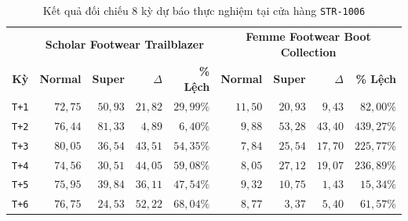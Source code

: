 \begin{table}[H]
	\centering
	\caption{Kết quả đối chiếu $8$ kỳ dự báo thực nghiệm tại cửa hàng \texttt{STR-1006}}
	\label{tab:forecast-empirical}
	\footnotesize
	\begin{tabular}{c | r r r r | r r r r}
		\toprule
		             & \multicolumn{4}{c|}{\textbf{Scholar Footwear Trailblazer}} & \multicolumn{4}{c}{\textbf{Femme Footwear Boot Collection}}                                                                                                                  \\
		\textbf{Kỳ}  & \textbf{Normal}                                            & \textbf{Super}                                              & \textbf{$\Delta$} & \textbf{\% Lệch} & \textbf{Normal} & \textbf{Super} & \textbf{$\Delta$} & \textbf{\% Lệch} \\
		\midrule
		\texttt{T+1} & $72{,}75$                                                  & $50{,}93$                                                   & $21{,}82$         & $29{,}99\%$      & $11{,}50$       & $20{,}93$      & $9{,}43$          & $82{,}00\%$      \\
		\texttt{T+2} & $76{,}44$                                                  & $81{,}33$                                                   & $4{,}89$          & $6{,}40\%$       & $9{,}88$        & $53{,}28$      & $43{,}40$         & $439{,}27\%$     \\
		\texttt{T+3} & $80{,}05$                                                  & $36{,}54$                                                   & $43{,}51$         & $54{,}35\%$      & $7{,}84$        & $25{,}54$      & $17{,}70$         & $225{,}77\%$     \\
		\texttt{T+4} & $74{,}56$                                                  & $30{,}51$                                                   & $44{,}05$         & $59{,}08\%$      & $8{,}05$        & $27{,}12$      & $19{,}07$         & $236{,}89\%$     \\
		\texttt{T+5} & $75{,}95$                                                  & $39{,}84$                                                   & $36{,}11$         & $47{,}54\%$      & $9{,}32$        & $10{,}75$      & $1{,}43$          & $15{,}34\%$      \\
		\texttt{T+6} & $76{,}75$                                                  & $24{,}53$                                                   & $52{,}22$         & $68{,}04\%$      & $8{,}77$        & $3{,}37$       & $5{,}40$          & $61{,}57\%$      \\

\end{tabular}
\end{table}
